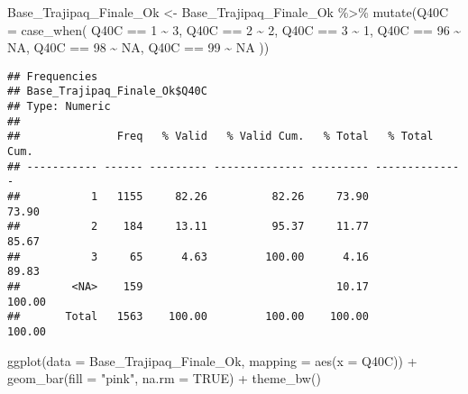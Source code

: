 \documentclass[
]{article}
\newenvironment{Shaded}{\begin{snugshade}}{\end{snugshade}}
\newcommand{\AttributeTok}[1]{\textcolor[rgb]{0.77,0.63,0.00}{#1}}
\newcommand{\ConstantTok}[1]{\textcolor[rgb]{0.00,0.00,0.00}{#1}}
\newcommand{\DecValTok}[1]{\textcolor[rgb]{0.00,0.00,0.81}{#1}}
\newcommand{\FunctionTok}[1]{\textcolor[rgb]{0.00,0.00,0.00}{#1}}
\newcommand{\NormalTok}[1]{#1}
\newcommand{\OtherTok}[1]{\textcolor[rgb]{0.56,0.35,0.01}{#1}}
\newcommand{\SpecialCharTok}[1]{\textcolor[rgb]{0.00,0.00,0.00}{#1}}
\newcommand{\StringTok}[1]{\textcolor[rgb]{0.31,0.60,0.02}{#1}}
\begin{document}
\begin{Shaded}
\begin{Highlighting}[]
\NormalTok{Base\_Trajipaq\_Finale\_Ok }\OtherTok{\textless{}{-}}
\NormalTok{  Base\_Trajipaq\_Finale\_Ok }\SpecialCharTok{\%\textgreater{}\%}
  \FunctionTok{mutate}\NormalTok{(}\AttributeTok{Q40C =} \FunctionTok{case\_when}\NormalTok{(}
\NormalTok{    Q40C }\SpecialCharTok{==} \DecValTok{1} \SpecialCharTok{\textasciitilde{}} \DecValTok{3}\NormalTok{,}
\NormalTok{    Q40C }\SpecialCharTok{==} \DecValTok{2} \SpecialCharTok{\textasciitilde{}} \DecValTok{2}\NormalTok{,}
\NormalTok{    Q40C }\SpecialCharTok{==} \DecValTok{3} \SpecialCharTok{\textasciitilde{}} \DecValTok{1}\NormalTok{,}
\NormalTok{    Q40C }\SpecialCharTok{==} \DecValTok{96} \SpecialCharTok{\textasciitilde{}} \ConstantTok{NA}\NormalTok{,}
\NormalTok{    Q40C }\SpecialCharTok{==} \DecValTok{98} \SpecialCharTok{\textasciitilde{}} \ConstantTok{NA}\NormalTok{,}
\NormalTok{    Q40C }\SpecialCharTok{==} \DecValTok{99} \SpecialCharTok{\textasciitilde{}} \ConstantTok{NA}
\NormalTok{  ))}
\end{Highlighting}
\end{Shaded}

\begin{Shaded}
\end{Shaded}

\begin{verbatim}
## Frequencies  
## Base_Trajipaq_Finale_Ok$Q40C  
## Type: Numeric  
## 
##               Freq   % Valid   % Valid Cum.   % Total   % Total Cum.
## ----------- ------ --------- -------------- --------- --------------
##           1   1155     82.26          82.26     73.90          73.90
##           2    184     13.11          95.37     11.77          85.67
##           3     65      4.63         100.00      4.16          89.83
##        <NA>    159                              10.17         100.00
##       Total   1563    100.00         100.00    100.00         100.00
\end{verbatim}

\begin{Shaded}
\begin{Highlighting}[]
\FunctionTok{ggplot}\NormalTok{(}\AttributeTok{data =}\NormalTok{ Base\_Trajipaq\_Finale\_Ok, }\AttributeTok{mapping =} \FunctionTok{aes}\NormalTok{(}\AttributeTok{x =}\NormalTok{ Q40C)) }\SpecialCharTok{+}
  \FunctionTok{geom\_bar}\NormalTok{(}\AttributeTok{fill =} \StringTok{"pink"}\NormalTok{, }\AttributeTok{na.rm =} \ConstantTok{TRUE}\NormalTok{) }\SpecialCharTok{+}
  \FunctionTok{theme\_bw}\NormalTok{()}
\end{Highlighting}
\end{Shaded}
\end{document}

